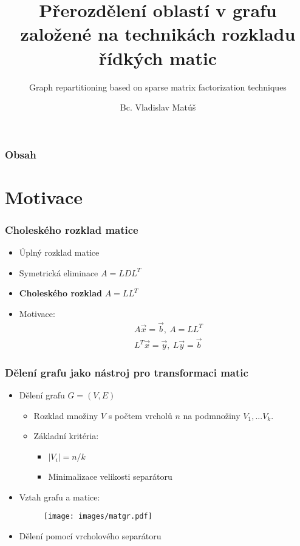 \documentclass{beamer}
\title[Přerozdělení oblastí v grafu]{Přerozdělení oblastí v grafu založené na technikách rozkladu řídkých matic}
\subtitle{Graph repartitioning based on sparse matrix factorization techniques}
\author{Bc. Vladislav Matúš} %
\institute[FJFI ČVUT]
{
  České vysoké učení technické v Praze \\
  Fakulta jaderná a fyzikálně inženýrská  \\ %
\medskip
Obor Matematická informatika
}
\date{}
\begin{document}
\begin{frame}
	\titlepage
\end{frame}


\begin{frame}
	\only
	\frametitle{Obsah}
	\tableofcontents[]
\end{frame}

	\section{Motivace}

\begin{frame}
  \frametitle{Choleského rozklad matice}	
  \begin{itemize}
    \item Úplný rozklad matice
    \medskip
    \item Symetrická eliminace $A=LDL^T$
    \medskip
    \item \textbf{Choleského rozklad} $A=LL^T$
    \medskip
    \item Motivace:
      \begin{align*}
      &A\vec{x} = \vec{b}, \ A=LL^T    \\
      &L^T\vec{x}=\vec{y}, \ L\vec{y}=\vec{b}
      \end{align*}
  \end{itemize}
\end{frame}

\begin{frame}
  \frametitle{Dělení grafu jako nástroj pro transformaci matic}
  \begin{itemize}
    \item Dělení grafu $G=(V,E)$ 
    \medskip
    \begin{itemize}
      \item Rozklad množiny $V$ s počtem vrcholů $n$ na podmnožiny $V_1,...V_k$.
      \medskip
      \item Základní kritéria:
      \begin{itemize}
        \item$|V_i| = n/k$
        \item Minimalizace velikosti separátoru
      \end{itemize}
    \end{itemize}
    \medskip
    \item Vztah grafu a matice:
      \begin{figure}
        \texttt{[image: images/matgr.pdf]}
      \end{figure}
    \medskip
    \item Dělení pomocí vrcholového separátoru
  \end{itemize}
\end{frame}
\end{document}
